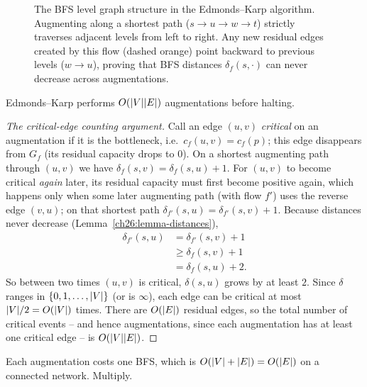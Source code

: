 \begin{figure}[h]
\caption{The BFS level graph structure in the Edmonds--Karp algorithm. Augmenting along a shortest path ($s \to u \to w \to t$) strictly traverses adjacent levels from left to right. Any new residual edges created by this flow (dashed orange) point backward to previous levels ($w \to u$), proving that BFS distances $\delta_f(s, \cdot)$ can never decrease across augmentations.}
\label{ch26:fig-ek-level-graph}
\end{figure}

\begin{lemma}
\label{ch26:lemma-count}
Edmonds--Karp performs $O(\lvert V\rvert\lvert E\rvert)$ augmentations before halting.
\end{lemma}

\begin{proof}[The critical-edge counting argument]
Call an edge $(u,v)$ \emph{critical} on an augmentation if it is the bottleneck,
i.e.\ $c_f(u,v) = c_f(p)$; this edge disappears from $G_f$ (its residual
capacity drops to $0$). On a shortest augmenting path through $(u,v)$ we have
$\delta_f(s,v) = \delta_f(s,u) + 1$. For $(u,v)$ to become critical \emph{again}
later, its residual capacity must first become positive again, which happens
only when some later augmenting path (with flow $f'$) uses the reverse edge
$(v,u)$; on that shortest path $\delta_{f'}(s,u) = \delta_{f'}(s,v) + 1$.
Because distances never decrease (Lemma~\ref{ch26:lemma-distances}),
\begin{align*}
  \delta_{f'}(s,u) &= \delta_{f'}(s,v) + 1 \\
                   &\ge \delta_f(s,v) + 1 \\
                   &= \delta_f(s,u) + 2.
\end{align*}
So between two times $(u,v)$ is critical, $\delta(s,u)$ grows by at least $2$. Since
$\delta$ ranges in $\{0,1,\dots,\lvert V\rvert\}$ (or is $\infty$), each edge can be
critical at most $\lvert V\rvert/2 = O(\lvert V\rvert)$ times. There are $O(\lvert E\rvert)$
residual edges, so the total number of critical events -- and hence
augmentations, since each augmentation has at least one critical edge -- is
$O(\lvert V\rvert\lvert E\rvert)$.
\end{proof}

Each augmentation costs one BFS, which is $O(\lvert V\rvert + \lvert E\rvert) = O(\lvert E\rvert)$
on a connected network. Multiply.

